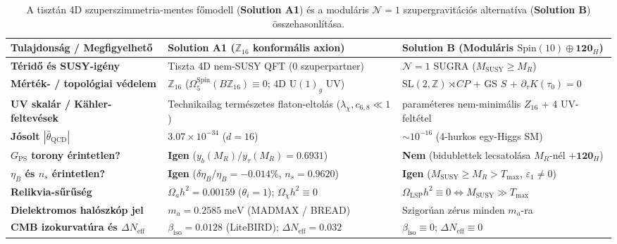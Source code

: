 \documentclass[11pt,a4paper]{article}
\begin{document}
\begin{table}[t!]
\centering
\caption{A tisztán 4D szuperszimmetria-mentes főmodell (\textbf{Solution A1}) és a moduláris $\mathcal{N}=1$ szupergravitációs alternatíva (\textbf{Solution B}) összehasonlítása.}
\label{tab:hu-comp}
\vspace{0.35em}
\renewcommand{\arraystretch}{1.18}
\begin{tabularx}{\textwidth}{>{\bfseries}l >{\raggedright\arraybackslash}X >{\raggedright\arraybackslash}X}
\toprule
Tulajdonság / Megfigyelhető & \textbf{Solution A1 ($\mathbb{Z}_{16}$ konformális axion)} & \textbf{Solution B (Moduláris $\mathrm{Spin}(10)\oplus\mathbf{120}_H$)} \\
\midrule
Téridő és SUSY-igény & Tiszta 4D nem-SUSY QFT (0 szuperpartner) & $\mathcal{N}=1$ SUGRA ($M_{\mathrm{SUSY}} \ge M_R$) \\
Mérték- / topológiai védelem & $\mathbb{Z}_{16}$ ($\Omega_5^{\mathrm{Spin}}(B\mathbb{Z}_{16}) \equiv 0$; 4D $\mathrm{U}(1)_g$ UV) & $\mathrm{SL}(2,\mathbb{Z})\rtimes CP$ + GS $S$ + $\partial_\tau K(\tau_0)=0$ \\
UV skalár / Kähler-feltevések & Technikailag természetes flaton-eltolás ($\lambda_\chi, c_{6,8} \ll 1$) & 26 paraméteres nem-minimális $Z_{16}$ + 4 UV-feltétel \\
Jósolt $|\bar{\theta}_{\mathrm{QCD}}|$ & $3.07\times 10^{-34}$ ($d = 16$) & $\sim 10^{-16}$ (4-hurkos egy-Higgs SM) \\
\cite{Olcsak2026Paper25} $G_{\mathrm{PS}}$ torony érintetlen? & \textbf{Igen} ($y_b(M_R)/y_\tau(M_R) = 0.6931$) & \textbf{Nem} (bidublettek lecsatolása $M_R$-nél $+ \mathbf{120}_H$) \\
\cite{Olcsak2026Paper24} $\eta_B$ és $n_s$ érintetlen? & \textbf{Igen} ($\delta\eta_B/\eta_B = -0.014\%$, $n_s = 0.9620$) & \textbf{Igen} ($M_{\mathrm{SUSY}} \ge M_R > T_{\max}$, $\varepsilon_1 \neq 0$) \\
Relikvia-sűrűség & $\Omega_a h^2 = 0.00159$ ($\theta_i=1$); $\Omega_\chi h^2 \equiv 0$ & $\Omega_{\mathrm{LSP}}h^2 \equiv 0 \iff M_{\mathrm{SUSY}} \gg T_{\max}$ \\
Dielektromos halószkóp jel & $m_a = 0.2585\;\mathrm{meV}$ (MADMAX / BREAD) & Szigorúan zérus minden $m_a$-ra \\
CMB izokurvatúra és $\Delta N_{\mathrm{eff}}$ & $\beta_{\mathrm{iso}} = 0.0128$ (LiteBIRD); $\Delta N_{\mathrm{eff}} = 0.032$ & $\beta_{\mathrm{iso}} \equiv 0$; $\Delta N_{\mathrm{eff}} \equiv 0$ \\
\bottomrule
\end{tabularx}
\end{table}
\end{document}
